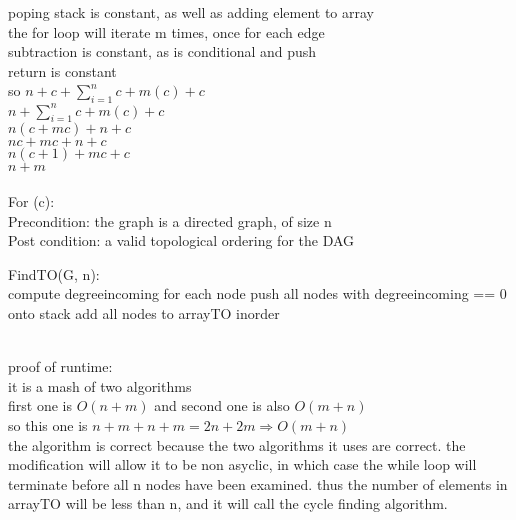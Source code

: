 \documentclass{assignment}
\begin{document}
\begin{problemlist}
\begin{answer}
poping stack is constant, as well as adding element to array\\
the for loop will iterate m times, once for each edge\\
subtraction is constant, as is conditional and push\\
return is constant\\
so $n + c + \sum_{i=1}^n {c + m(c)} + c$\\
$n + \sum_{i=1}^n {c + m(c)} + c$\\
$n(c + mc) + n + c$\\
$nc + mc + n + c$\\
$n(c+1)+mc+c$\\
$n+m$\\
\\For (c):\\
Precondition: the graph is a directed graph, of size n\\
Post condition: a valid topological ordering for the DAG\\
\begin{algorithm}
  FindTO(G, n):\\{
    compute degreeincoming for each node\;
    push all nodes with degreeincoming == 0 onto stack\;
    add all nodes to arrayTO inorder\;
  }
\end{algorithm}
\\
proof of runtime:\\
it is a mash of two algorithms\\
first one is $O(n+m)$ and second one is also $O(m+n)$\\
so this one is $n+m +n+m= 2n+2m\Rightarrow O(m+n)$\\
the algorithm is correct because the two algorithms it uses are correct.
the modification will allow it to be non asyclic, in which case the while loop will terminate before all n nodes have been examined. thus the number of elements in arrayTO will be less than n, and it will call the cycle finding algorithm.\\
\end{answer}

\end{problemlist}
\end{document}
